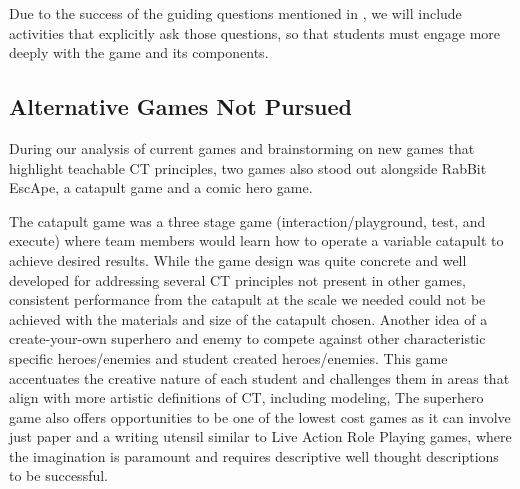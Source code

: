 \documentclass{acm_proc_article-sp}
\begin{document}
Due to the success of the guiding questions mentioned in {\em \hyperref[sec:observations]{}}, we will include activities that explicitly ask  those questions, so that students must engage more deeply with the game and its components.

\subsection{Alternative Games Not Pursued}
\label{sec:terminated_games}
During our analysis of current games and brainstorming on new games that highlight teachable CT principles, two games also stood out alongside RabBit EscApe, a catapult game and a comic hero game.

The catapult game was a three stage game (interaction/playground, test, and execute) where team members would learn how to operate a variable catapult to achieve desired results.
While the game design was quite concrete and well developed for addressing several CT principles not present in other games, consistent performance from the catapult at the scale we needed could not be achieved with the materials and size of the catapult chosen.
Another idea of a create-your-own superhero and enemy to compete against other characteristic specific heroes/enemies and student created heroes/enemies.
This game accentuates the creative nature of each student and challenges them in areas that align with more artistic definitions of CT, including modeling, 
The superhero game also offers opportunities to be one of the lowest cost games as it can involve just paper and a writing utensil similar to Live Action Role Playing games, where the imagination is paramount and requires descriptive well thought descriptions to be successful.
\end{document}
